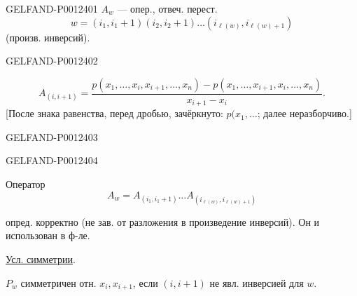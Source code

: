 \begin{GelfandAdjacentEvidence}{GELFAND-P001240}{1}
$A_w$ — опер., отвеч. перест.
\begin{equation*}
w=(i_1,i_1+1)(i_2,i_2+1)\ldots(i_{\ell(w)},i_{\ell(w)+1})
\end{equation*}
(произв. инверсий).
\end{GelfandAdjacentEvidence}
\begin{GelfandAdjacentEvidence}{GELFAND-P001240}{2}


\begin{equation*}
A_{(i,i+1)}=
\frac{p(x_1,\ldots,x_i,x_{i+1},\ldots,x_n)-p(x_1,\ldots,x_{i+1},x_i,\ldots,x_n)}{x_{i+1}-x_i}.
\end{equation*}
[После знака равенства, перед дробью, зачёркнуто: $p(x_1,\ldots$; далее неразборчиво.]
\end{GelfandAdjacentEvidence}
\begin{GelfandAdjacentEvidence}{GELFAND-P001240}{3}

\end{GelfandAdjacentEvidence}
\begin{GelfandAdjacentEvidence}{GELFAND-P001240}{4}


Оператор
\begin{equation*}
A_w=A_{(i_1,i_1+1)}\ldots A_{(i_{\ell(w)},i_{\ell(w)+1})}
\end{equation*}
\end{GelfandAdjacentEvidence}


опред. корректно (не зав. от разложения в произведение инверсий).
Он и использован в ф-ле.

\underline{Усл. симметрии}.

$P_w$ симметричен отн. $x_i,x_{i+1}$, если $(i,i+1)$ не явл. инверсией для $w$.


